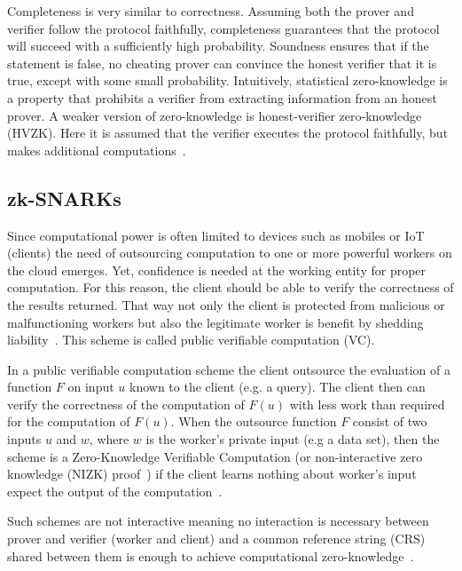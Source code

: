 Completeness is very similar to correctness. Assuming both the prover and verifier follow the protocol faithfully, completeness guarantees that the
protocol will succeed with a sufficiently high probability.
Soundness ensures that if the statement is false, no cheating prover can convince the honest verifier that it is true, except with some small probability.
Intuitively, statistical zero-knowledge is a property that prohibits a verifier from extracting information from an honest prover.
A weaker version of zero-knowledge is honest-verifier zero-knowledge (HVZK). Here it is assumed that the verifier executes the protocol faithfully,
but makes additional computations~\cite{kiagias:crypto}.

\subsection{zk-SNARKs}
\label{zkp:snarks}

Since computational power is often limited to devices such as mobiles or IoT (clients) the need of outsourcing computation to one or more powerful workers on the cloud emerges. Yet, confidence is needed at the working entity for proper computation. For this reason, the client should be able to verify the correctness of the results returned. That way not only the client is protected from malicious or malfunctioning workers but also the legitimate worker is benefit by shedding liability~\cite{pinocchio-nearly-practical-verifiable-computation}. This scheme is called public verifiable computation (VC).

In a public verifiable computation scheme the client outsource the evaluation of a function $F$ on input $u$ known to the client (e.g. a query). The client then can verify the correctness of the computation of $F(u)$ with less work than required for the computation of $F(u)$. When the outsource function $F$ consist of two inputs $u$ and $w$, where $w$ is the worker's private input (e.g a data set), then the scheme is a Zero-Knowledge Verifiable Computation (or non-interactive zero knowledge (NIZK) proof~\cite{Blum:1991:NZ:123137.123145}) if the client learns nothing about worker's input expect the output of the computation~\cite{pinocchio-nearly-practical-verifiable-computation}.

Such schemes are not interactive meaning no interaction is necessary between prover and verifier (worker and client) and a common reference string (CRS) shared between them is enough to achieve computational zero-knowledge~\cite{Blum:1991:NZ:123137.123145}.

